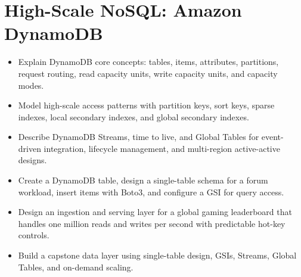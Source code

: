 \chapter{High-Scale NoSQL: Amazon DynamoDB}
%
%
\begin{objectives}
\begin{itemize}
    \item Explain DynamoDB core concepts: tables, items, attributes, partitions, request routing, read capacity units, write capacity units, and capacity modes.
    \item Model high-scale access patterns with partition keys, sort keys, sparse indexes, local secondary indexes, and global secondary indexes.
    \item Describe DynamoDB Streams, time to live, and Global Tables for event-driven integration, lifecycle management, and multi-region active-active designs.
    \item Create a DynamoDB table, design a single-table schema for a forum workload, insert items with Boto3, and configure a GSI for query access.
    \item Design an ingestion and serving layer for a global gaming leaderboard that handles one million reads and writes per second with predictable hot-key controls.
    \item Build a capstone data layer using single-table design, GSIs, Streams, Global Tables, and on-demand scaling.
\end{itemize}
\end{objectives}
